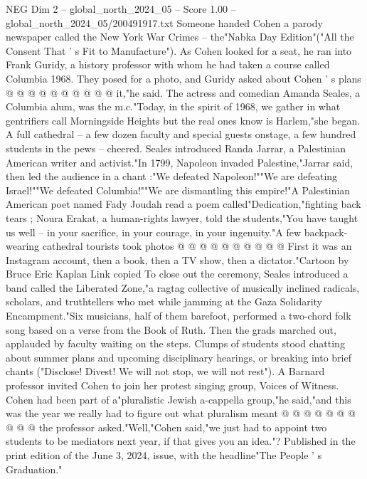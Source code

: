 \begin{textsample}{NEG Dim 2 – global\_north\_2024\_05 – Score 1.00 – global\_north\_2024\_05/200491917.txt}
Someone handed Cohen a parody newspaper called the New York War Crimes -- the"Nabka Day Edition"("All the Consent That ' s Fit to Manufacture").
As Cohen looked for a seat, he ran into Frank Guridy, a history professor with whom he had taken a course called Columbia 1968.
They posed for a photo, and Guridy asked about Cohen ' s plans @ @ @ @ @ @ @ @ @ @ it,"he said.
The actress and comedian Amanda Seales, a Columbia alum, was the m.c."Today, in the spirit of 1968, we gather in what gentrifiers call Morningside Heights but the real ones know is Harlem,"she began.
A full cathedral -- a few dozen faculty and special guests onstage, a few hundred students in the pews -- cheered.
Seales introduced Randa Jarrar, a Palestinian American writer and activist."In 1799, Napoleon invaded Palestine,"Jarrar said, then led the audience in a chant :"We defeated Napoleon!""We are defeating Israel!""We defeated Columbia!""We are dismantling this empire!"A Palestinian American poet named Fady Joudah read a poem called"Dedication,"fighting back tears ; Noura Erakat, a human-rights lawyer, told the students,"You have taught us well -- in your sacrifice, in your courage, in your ingenuity."A few backpack-wearing cathedral tourists took photos @ @ @ @ @ @ @ @ @ @ First it was an Instagram account, then a book, then a TV show, then a dictator."Cartoon by Bruce Eric Kaplan Link copied To close out the ceremony, Seales introduced a band called the Liberated Zone,"a ragtag collective of musically inclined radicals, scholars, and truthtellers who met while jamming at the Gaza Solidarity Encampment."Six musicians, half of them barefoot, performed a two-chord folk song based on a verse from the Book of Ruth.
Then the grads marched out, applauded by faculty waiting on the steps.
Clumps of students stood chatting about summer plans and upcoming disciplinary hearings, or breaking into brief chants ("Disclose!
Divest!
We will not stop, we will not rest").
A Barnard professor invited Cohen to join her protest singing group, Voices of Witness.
Cohen had been part of a"pluralistic Jewish a-cappella group,"he said,"and this was the year we really had to figure out what pluralism meant @ @ @ @ @ @ @ @ @ @ the professor asked."Well,"Cohen said,"we just had to appoint two students to be mediators next year, if that gives you an idea."?
Published in the print edition of the June 3, 2024, issue, with the headline"The People ' s Graduation."

\end{textsample}

